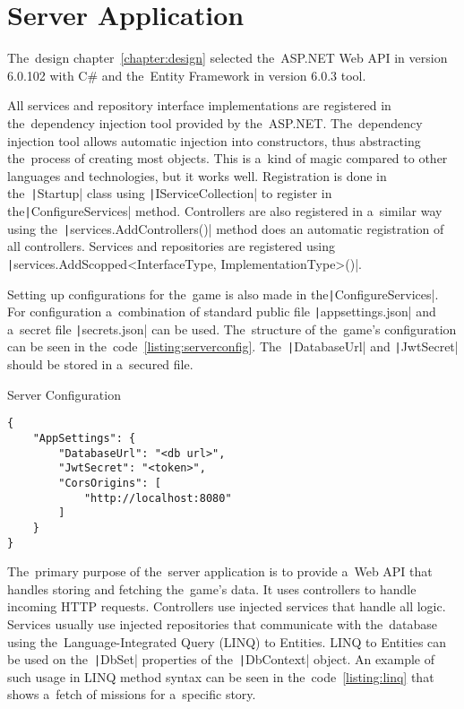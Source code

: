 \section{Server Application}

The~design chapter~\ref{chapter:design} selected the~ASP.NET Web API in version 6.0.102 with C\# and the~Entity Framework in version 6.0.3 tool.

All services and repository interface implementations are registered in the~dependency injection tool provided by the~ASP.NET.
The~dependency injection tool allows automatic injection into constructors, thus abstracting the~process of creating most objects.
This is a~kind of magic compared to other languages and technologies, but it works well.
Registration is done in the~\texttt|Startup| class using \texttt|IServiceCollection| to register in the\linebreak{}\texttt|ConfigureServices| method.
Controllers are also registered in a~similar way using the~\texttt|services.AddControllers()| method does an automatic registration of all controllers.
Services and repositories are registered using \texttt|services.AddScopped<InterfaceType, ImplementationType>()|.

Setting up configurations for the~game is also made in the\linebreak{}\texttt|ConfigureServices|.
For configuration a~combination of standard public file \texttt|appsettings.json| and a~secret file \texttt|secrets.json| can be used.
The~structure of the~game's configuration can be seen in the~code~\ref{listing:serverconfig}.
The~\texttt|DatabaseUrl| and \texttt|JwtSecret| should be stored in a~secured file.

\begin{listing}
    \caption{Server Configuration}
    \label{listing:serverconfig}
    \begin{verbatim}
{
    "AppSettings": {
        "DatabaseUrl": "<db url>",
        "JwtSecret": "<token>",
        "CorsOrigins": [
            "http://localhost:8080"
        ]
    }
}
    \end{verbatim}
\end{listing}

The~primary purpose of the~server application is to provide a~Web API that handles storing and fetching the~game's data.
It uses controllers to handle incoming HTTP requests.
Controllers use injected services that handle all logic.
Services usually use injected repositories that communicate with the~database using the~Language-Integrated Query (LINQ) to Entities.
LINQ to Entities can be used on the~\texttt|DbSet| properties of the~\texttt|DbContext| object.
An example of such usage in LINQ method syntax can be seen in the~code~\ref{listing:linq} that shows a~fetch of missions for a~specific story.

